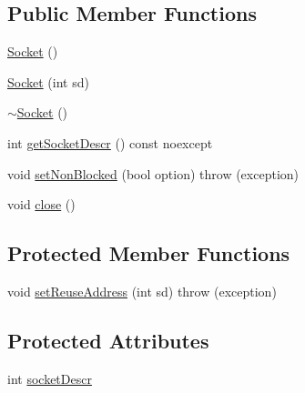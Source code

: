 \subsection*{Public Member Functions}
\begin{DoxyCompactItemize}
\item 
\hyperlink{class_socket_a7c3256c4fc6e2c603df73201049fae5a}{Socket} ()
\item 
\hyperlink{class_socket_aaba0adce0be29d723470f6e80d65b67e}{Socket} (int sd)
\item 
\hyperlink{class_socket_aeac4eb6379a543d38ed88977d3b6630a}{$\sim$\-Socket} ()
\item 
int \hyperlink{class_socket_ae10384da04283e2a75b4cfbb8c6da59a}{get\-Socket\-Descr} () const noexcept
\item 
void \hyperlink{class_socket_aa264f52f830e5c1bea3cd92732df35f8}{set\-Non\-Blocked} (bool option)  throw (exception)
\item 
void \hyperlink{class_socket_a75ee749264ccbcfc4dfbf5442e55dcb8}{close} ()
\end{DoxyCompactItemize}
\subsection*{Protected Member Functions}
\begin{DoxyCompactItemize}
\item 
void \hyperlink{class_socket_a51eb429ad7f6f6ab1adafe64d302ed55}{set\-Reuse\-Address} (int sd)  throw (exception)
\end{DoxyCompactItemize}
\subsection*{Protected Attributes}
\begin{DoxyCompactItemize}
\item 
int \hyperlink{class_socket_a610fbf456550dd084cfaee9d1267e5c8}{socket\-Descr}
\end{DoxyCompactItemize}


